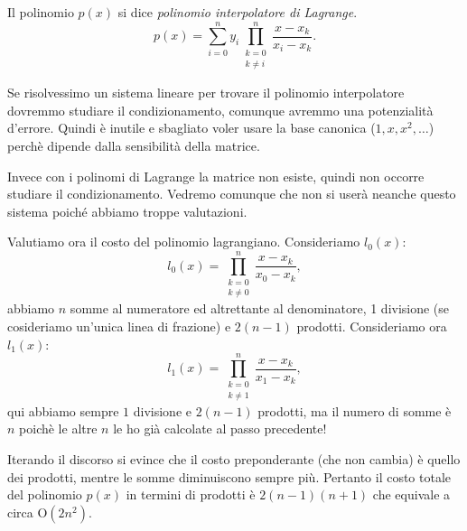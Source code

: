 \begin{defi}
\begin{flushleft}
Il polinomio $p(x)$ si dice \emph{polinomio interpolatore di Lagrange}.
\[p(x) = \sum_{i=0}^ny_i\prod_{\substack{k=0\\ k \neq i }}^n \frac{x-x_k}{x_i-x_k}.\]
\end{flushleft}
\end{defi}

\begin{osse}
Se risolvessimo un sistema lineare per trovare il polinomio interpolatore
dovremmo studiare il condizionamento, comunque avremmo una potenzialità
d'errore.
Quindi è inutile e sbagliato voler usare la base canonica ($1, x, x^2,
\ldots$) perchè dipende dalla sensibilità della matrice.

Invece con i polinomi di Lagrange la matrice non esiste, quindi non occorre
studiare il condizionamento. Vedremo comunque che non si userà neanche
questo sistema poiché abbiamo troppe valutazioni.
\end{osse}

Valutiamo ora il costo del polinomio lagrangiano. Consideriamo $l_0(x)$:
\[ l_0(x) = \prod_{\substack{k=0\\ k \neq 0 }}^n \frac{x-x_k}{x_0-x_k}, \]
abbiamo $n$ somme al numeratore ed altrettante al denominatore, 1 divisione (se
cosideriamo un'unica linea di frazione) e $2(n-1)$ prodotti. Consideriamo ora $l_1(x)$:
\[ l_1(x) = \prod_{\substack{k=0\\ k \neq 1 }}^n \frac{x-x_k}{x_1-x_k}, \]
qui abbiamo sempre $1$ divisione e $2(n-1)$ prodotti, ma il numero di somme è
$n$ poichè le altre $n$ le ho già calcolate al passo precedente!

Iterando il discorso si evince che il costo preponderante (che non cambia) è
quello dei prodotti, mentre le somme diminuiscono sempre più. Pertanto il costo
totale del polinomio $p(x)$ in termini di prodotti è $2(n-1)(n+1)$ che equivale
a circa O$(2n^2)$.

